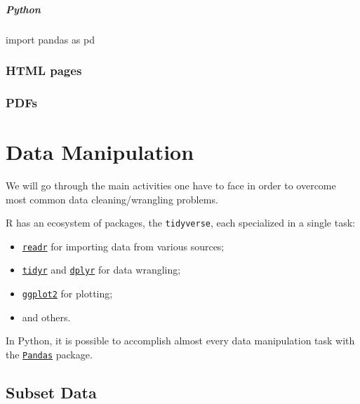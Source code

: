 \documentclass[
  letterpaper,
  DIV=11,
  numbers=noendperiod]{scrreprt}
\newenvironment{Shaded}{\begin{snugshade}}{\end{snugshade}}
\newcommand{\ImportTok}[1]{\textcolor[rgb]{0.00,0.46,0.62}{#1}}
\newcommand{\NormalTok}[1]{\textcolor[rgb]{0.00,0.46,0.62}{#1}}
\providecommand{\tightlist}{%
  \setlength{\itemsep}{0pt}\setlength{\parskip}{0pt}}
\begin{document}
\hypertarget{python-11}{%
\subsubsection{Python}\label{python-11}}

\begin{Shaded}
\begin{Highlighting}[]
\ImportTok{import}\NormalTok{ pandas }\ImportTok{as}\NormalTok{ pd}
\end{Highlighting}
\end{Shaded}

\hypertarget{html-pages}{%
\section{HTML pages}\label{html-pages}}

\hypertarget{pdfs}{%
\section{PDFs}\label{pdfs}}

\part{Data Manipulation}

We will go through the main activities one have to face in order to
overcome most common data cleaning/wrangling problems.

R has an ecosystem of packages, the \texttt{tidyverse}, each specialized
in a single task:

\begin{itemize}
\tightlist
\item
  \href{https://readr.tidyverse.org/}{\texttt{readr}} for importing data
  from various sources;
\item
  \href{https://tidyr.tidyverse.org/}{\texttt{tidyr}} and
  \href{https://dplyr.tidyverse.org/}{\texttt{dplyr}} for data
  wrangling;
\item
  \href{https://ggplot2.tidyverse.org/}{\texttt{ggplot2}} for plotting;
\item
  and others.
\end{itemize}

In Python, it is possible to accomplish almost every data manipulation
task with the \href{https://pandas.pydata.org/}{\texttt{Pandas}}
package.

\hypertarget{sec-subset}{%
\chapter{Subset Data}\label{sec-subset}}
\end{document}

